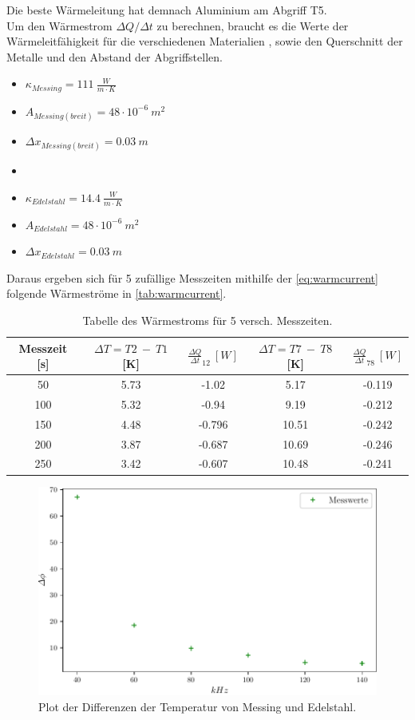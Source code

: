 Die beste Wärmeleitung hat demnach Aluminium am Abgriff T5.\\
Um den Wärmestrom $\Delta Q/\Delta t$ zu berechnen, braucht es die Werte der Wärmeleitfähigkeit für die verschiedenen Materialien \cite{web}, sowie den Querschnitt der Metalle und den Abstand der Abgriffstellen.
\begin{itemize}
    \centering
    \item[] $\kappa_{Messing} = 111\ \frac{W}{m\cdot K}$
    \item[] $A_{Messing(breit)} = 48\cdot 10^{-6}\ m^2$
    \item[] $\Delta x_{Messing(breit)} = 0.03\ m$ 
    \item[] 
    \item[] $\kappa_{Edelstahl} = 14.4\ \frac{W}{m\cdot K}$
    \item[] $A_{Edelstahl} = 48\cdot 10^{-6}\ m^2$
    \item[] $\Delta x_{Edelstahl} = 0.03\ m$ 
\end{itemize}

Daraus ergeben sich für 5 zufällige Messzeiten mithilfe der \autoref{eq:warmcurrent} folgende Wärmeströme in \autoref{tab:warmcurrent}.

\begin{table}
    \centering
    \caption{Tabelle des Wärmestroms für 5 versch. Messzeiten.}
    \begin{tabular}{c|c|c|c|c}
        \toprule
        Messzeit [s] & $\Delta T = T2\ -\ T1$ [K] & $\frac{\Delta Q}{\Delta t}_{12}\ [W]$ & $\Delta T = T7\ -\ T8$ [K] & $\frac{\Delta Q}{\Delta t}_{78}\ [W]$\\
        \midrule
        50 & 5.73 & -1.02 & 5.17 & -0.119\\
        100 & 5.32 & -0.94 & 9.19 & -0.212\\
        150 & 4.48 & -0.796 & 10.51 & -0.242\\
        200 & 3.87 & -0.687 & 10.69 & -0.246\\
        250 & 3.42 & -0.607 & 10.48 & -0.241\\
    \end{tabular}
    \label{tab:warmcurrent}
\end{table}

\begin{figure}
    \centering
    \includegraphics[scale=0.7]{build/plot3.pdf}
    \caption{Plot der Differenzen der Temperatur von Messing und Edelstahl.}
    \label{fig:deltaT}
\end{figure}

\newpage
